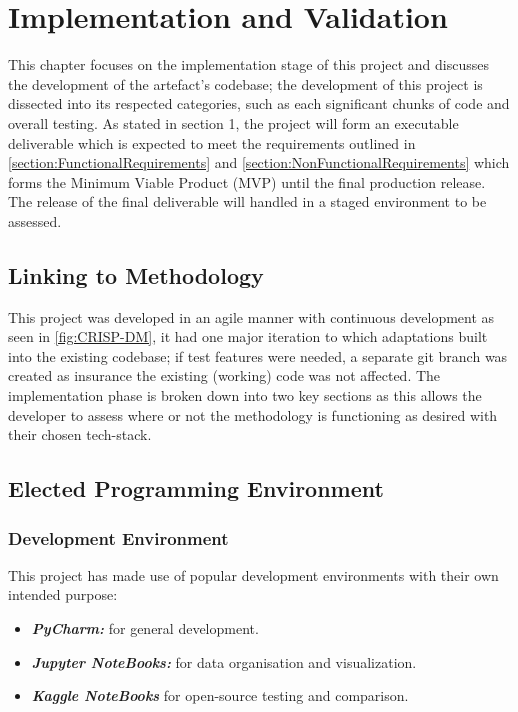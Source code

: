 \chapter{Implementation and Validation}

This chapter focuses on the implementation stage of this project and discusses the development of the artefact's codebase; the development of this project is dissected into its respected categories, such as each significant chunks of code and overall testing. As stated in section 1, the project will form an executable deliverable which is expected to meet the requirements outlined in \autoref{section:FunctionalRequirements} and \autoref{section:NonFunctionalRequirements} which forms the Minimum Viable Product (MVP) until the final production release. The release of the final deliverable will handled in a staged environment to be assessed.

\section{Linking to Methodology}

This project was developed in an agile manner with continuous development as seen in \autoref{fig:CRISP-DM}, it had one major iteration to which adaptations built into the existing codebase; if test features were needed, a separate git branch was created as insurance the existing (working) code was not affected. The implementation phase is broken down into two key sections as this allows the developer to assess where or not the methodology is functioning as desired with their chosen tech-stack.

\section{Elected Programming Environment}

\subsection{Development Environment}

This project has made use of popular development environments with their own intended purpose:
\begin{itemize}
    \item \textbf{\textit{PyCharm:}} for general development.
    \item \textbf{\textit{Jupyter NoteBooks:}} for data organisation and visualization.
    \item \textbf{\textit{Kaggle NoteBooks}} for open-source testing and comparison.
\end{itemize}

